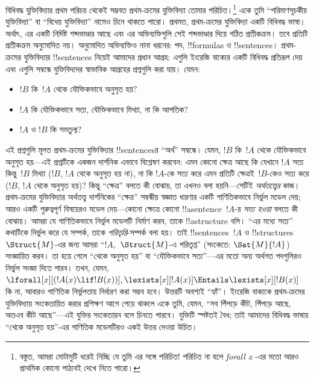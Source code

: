 \documentclass[../../../include/open-logic-section]{subfiles}
\begin{document}


বিধিবদ্ধ যুক্তিবিদ্যার প্রথম পরিচয় থেকেই সম্ভবত প্রথম-ক্রমের যুক্তিবিদ্যা
তোমার পরিচিত।\footnote{বস্তুত, আমরা মোটামুটি ধরেই নিচ্ছি যে তুমি এর সঙ্গে
পরিচিত!{} পরিচিত না হলে \emph{forall x} \citep{Magnus2021}-এর মতো আরও
প্রাথমিক কোনো পাঠ্যবই দেখে নিতে পারো।} একে তুমি “পরিমাণসূচকীয়
যুক্তিবিদ্যা” বা “বিধেয় যুক্তিবিদ্যা” নামেও চিনে থাকতে পারো। প্রথমত,
প্রথম-ক্রমের যুক্তিবিদ্যা একটি বিধিবদ্ধ ভাষা। অর্থাৎ, এর একটি নির্দিষ্ট
শব্দভাণ্ডার আছে এবং এর অভিব্যক্তিগুলি সেই শব্দভাণ্ডার দিয়ে গঠিত
প্রতীকক্রম। তবে প্রতিটি প্রতীকক্রম অনুমোদিত নয়। অনুমোদিত অভিব্যক্তিও নানা
ধরনের: পদ, !!{formula}s ও !!{sentence}s। প্রথম-ক্রমের যুক্তিবিদ্যার
!!{sentence}s নিয়েই আমাদের প্রধান আগ্রহ: এগুলি ইংরেজি বাক্যের একটি
বিধিবদ্ধ প্রতিরূপ দেয় এবং এগুলি সম্বন্ধে যুক্তিবিদদের স্বাভাবিক আগ্রহের
প্রশ্নগুলি করা যায়। যেমন:
\begin{itemize}
    \item $!B$ কি~$!A$ থেকে যৌক্তিকভাবে অনুসৃত হয়?
    \item $!A$ কি যৌক্তিকভাবে সত্য, যৌক্তিকভাবে মিথ্যা, না কি
আপতিক?
    \item $!A$ ও $!B$ কি সমতুল্য?
\end{itemize}

এই প্রশ্নগুলি মূলত প্রথম-ক্রমের যুক্তিবিদ্যার !!{sentence}sর “অর্থ”
সম্বন্ধে। যেমন, $!B$ কি~$!A$ থেকে যৌক্তিকভাবে অনুসৃত হয়—এই প্রশ্নটিকে
একজন দার্শনিক এভাবে বিশ্লেষণ করবেন: এমন কোনো ক্ষেত্র আছে কি যেখানে $!A$
সত্য কিন্তু~$!B$ মিথ্যা ($!B$, $!A$ থেকে অনুসৃত হয় না), না কি $!A$-কে
সত্য করে এমন প্রতিটি ক্ষেত্রই~$!B$-কেও সত্য করে ($!B$, $!A$ থেকে
অনুসৃত হয়)? কিন্তু “ক্ষেত্র” বলতে কী বোঝায়, তা এখনও বলা হয়নি—সেটিই
\emph{অর্থতত্ত্বের} কাজ। প্রথম-ক্রমের যুক্তিবিদ্যার অর্থতত্ত্ব দার্শনিকের
“ক্ষেত্র” সম্বন্ধীয় স্বজ্ঞাত ধারণার একটি গাণিতিকভাবে নির্ভুল মডেল দেয়;
আরও একটি গুরুত্বপূর্ণ বিষয়েরও মডেল দেয়—কোনো ক্ষেত্রে কোনো
!!a{sentence}~$!A$-র \emph{সত্য হওয়া} বলতে কী বোঝায়। আমরা যে
গাণিতিকভাবে নির্ভুল মডেলটি নির্মাণ করব, তাকে !!a{structure} বলি। “এর
মধ্যে সত্য” কথাটিকে নির্ভুল করে যে সম্পর্ক, তাকে \emph{পরিতৃপ্তি}-সম্পর্ক
বলা হয়। তাই !!{sentence}s~$!A$ ও !!{structure}s~$\Struct{M}$-এর জন্য
আমরা “$!A$,~$\Struct{M}$-এ পরিতৃপ্ত” (সংকেতে: $\Sat{M}{!A}$) সংজ্ঞায়িত
করব। তা হয়ে গেলে “থেকে অনুসৃত হয়” বা “যৌক্তিকভাবে সত্য”—এর মতো অন্য
অর্থগত পদগুলিরও নির্ভুল সংজ্ঞা দিতে পারব। তখন, যেমন,
$\lforall[x][(!A(x) \lif !B(x))], \lexists[x][!A(x)] \Entails
\lexists[x][!B(x)]$ কি না, আবারও গাণিতিক নির্ভুলতায় নির্ধারণ করা সম্ভব
হবে। উত্তরটি অবশ্যই “হ্যাঁ”। ইংরেজি বাক্যকে প্রথম-ক্রমের যুক্তিবিদ্যায়
সংকেতায়িত করার প্রশিক্ষণ আগে পেয়ে থাকলে একে তুমি, যেমন, “সব পিঁপড়ে
কীট, পিঁপড়ে আছে, অতএব কীট আছে”—এই যুক্তির সংকেতায়ন বলে চিনতে পারবে।
যুক্তিটি স্পষ্টতই বৈধ; তাই আমাদের বিধিবদ্ধ ভাষায় “থেকে অনুসৃত হয়”-এর
গাণিতিক মডেলটিরও একই উত্তর দেওয়া উচিত।
\end{document}
